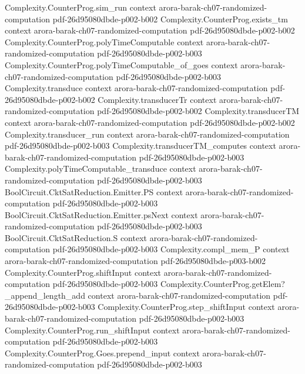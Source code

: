 \begin{theorem}
\proofstep
  {Complexity.CounterProg.sim_run}
  {context}
  {arora-barak-ch07-randomized-computation}
  {pdf-26d95080dbde-p002-b002}
\proofstep
  {Complexity.CounterProg.exists_tm}
  {context}
  {arora-barak-ch07-randomized-computation}
  {pdf-26d95080dbde-p002-b002}
\proofstep
  {Complexity.CounterProg.polyTimeComputable}
  {context}
  {arora-barak-ch07-randomized-computation}
  {pdf-26d95080dbde-p002-b003}
\proofstep
  {Complexity.CounterProg.polyTimeComputable_of_goes}
  {context}
  {arora-barak-ch07-randomized-computation}
  {pdf-26d95080dbde-p002-b003}
\proofstep
  {Complexity.transduce}
  {context}
  {arora-barak-ch07-randomized-computation}
  {pdf-26d95080dbde-p002-b002}
\proofstep
  {Complexity.transducerTr}
  {context}
  {arora-barak-ch07-randomized-computation}
  {pdf-26d95080dbde-p002-b002}
\proofstep
  {Complexity.transducerTM}
  {context}
  {arora-barak-ch07-randomized-computation}
  {pdf-26d95080dbde-p002-b002}
\proofstep
  {Complexity.transducer_run}
  {context}
  {arora-barak-ch07-randomized-computation}
  {pdf-26d95080dbde-p002-b003}
\proofstep
  {Complexity.transducerTM_computes}
  {context}
  {arora-barak-ch07-randomized-computation}
  {pdf-26d95080dbde-p002-b003}
\proofstep
  {Complexity.polyTimeComputable_transduce}
  {context}
  {arora-barak-ch07-randomized-computation}
  {pdf-26d95080dbde-p002-b003}
\proofstep
  {BoolCircuit.CktSatReduction.Emitter.PS}
  {context}
  {arora-barak-ch07-randomized-computation}
  {pdf-26d95080dbde-p002-b003}
\proofstep
  {BoolCircuit.CktSatReduction.Emitter.psNext}
  {context}
  {arora-barak-ch07-randomized-computation}
  {pdf-26d95080dbde-p002-b003}
\proofstep
  {BoolCircuit.CktSatReduction.S}
  {context}
  {arora-barak-ch07-randomized-computation}
  {pdf-26d95080dbde-p002-b003}
\proofstep
  {Complexity.compl_mem_P}
  {context}
  {arora-barak-ch07-randomized-computation}
  {pdf-26d95080dbde-p003-b002}
\proofstep
  {Complexity.CounterProg.shiftInput}
  {context}
  {arora-barak-ch07-randomized-computation}
  {pdf-26d95080dbde-p002-b003}
\proofstep
  {Complexity.CounterProg.getElem?_append_length_add}
  {context}
  {arora-barak-ch07-randomized-computation}
  {pdf-26d95080dbde-p002-b003}
\proofstep
  {Complexity.CounterProg.step_shiftInput}
  {context}
  {arora-barak-ch07-randomized-computation}
  {pdf-26d95080dbde-p002-b003}
\proofstep
  {Complexity.CounterProg.run_shiftInput}
  {context}
  {arora-barak-ch07-randomized-computation}
  {pdf-26d95080dbde-p002-b003}
\proofstep
  {Complexity.CounterProg.Goes.prepend_input}
  {context}
  {arora-barak-ch07-randomized-computation}
  {pdf-26d95080dbde-p002-b003}

\end{theorem}
